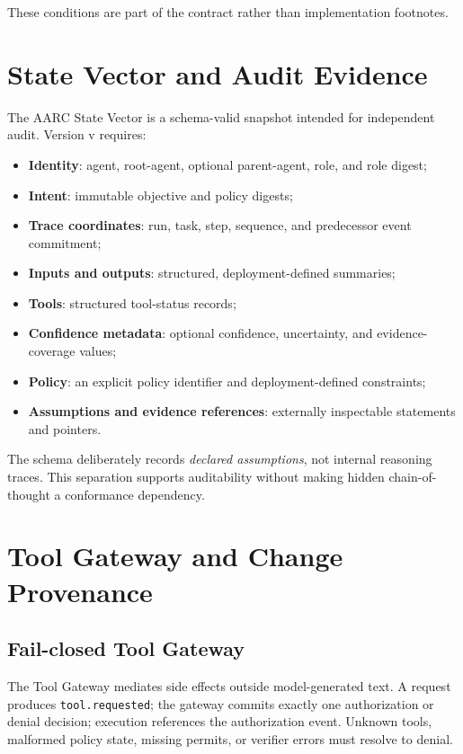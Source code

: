 \documentclass{article}
\begin{document}
These conditions are part of the contract rather than implementation footnotes.

\section{State Vector and Audit Evidence}

The AARC State Vector is a schema-valid snapshot intended for independent audit.
Version v\specVersion{} requires:

\begin{itemize}[leftmargin=*]
  \item \textbf{Identity}: agent, root-agent, optional parent-agent, role, and
  role digest;
  \item \textbf{Intent}: immutable objective and policy digests;
  \item \textbf{Trace coordinates}: run, task, step, sequence, and predecessor
  event commitment;
  \item \textbf{Inputs and outputs}: structured, deployment-defined summaries;
  \item \textbf{Tools}: structured tool-status records;
  \item \textbf{Confidence metadata}: optional confidence, uncertainty, and
  evidence-coverage values;
  \item \textbf{Policy}: an explicit policy identifier and deployment-defined
  constraints;
  \item \textbf{Assumptions and evidence references}: externally inspectable
  statements and pointers.
\end{itemize}

The schema deliberately records \emph{declared assumptions}, not internal
reasoning traces. This separation supports auditability without making hidden
chain-of-thought a conformance dependency.

\section{Tool Gateway and Change Provenance}

\subsection{Fail-closed Tool Gateway}

The Tool Gateway mediates side effects outside model-generated text.
A request produces \texttt{tool.requested}; the gateway commits exactly one
authorization or denial decision; execution references the authorization event.
Unknown tools, malformed policy state, missing permits, or verifier errors must
resolve to denial.
\end{document}
